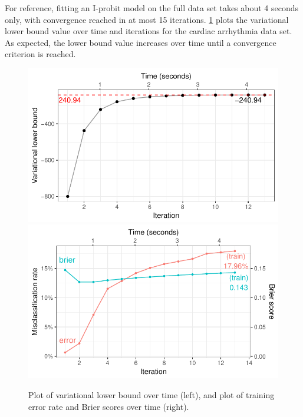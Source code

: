 \documentclass[a4paper,showframe,11pt]{report}\usepackage[]{graphicx}\usepackage[]{color}
\makeatletter
\newenvironment{kframe}{%
 \def\at@end@of@kframe{}%
 \ifinner\ifhmode%
  \def\at@end@of@kframe{\end{minipage}}%
  \begin{minipage}{\columnwidth}%
 \fi\fi%
 \def\FrameCommand##1{\hskip\@totalleftmargin \hskip-\fboxsep
 \colorbox{shadecolor}{##1}\hskip-\fboxsep
     \hskip-\linewidth \hskip-\@totalleftmargin \hskip\columnwidth}%
 \MakeFramed {\advance\hsize-\width
   \@totalleftmargin\z@ \linewidth\hsize
   \@setminipage}}%
 {\par\unskip\endMakeFramed%
 \at@end@of@kframe}
\newenvironment{knitrout}{}{} %
\makeatother
\begin{document}
For reference, fitting an I-probit model on the full data set takes about 4 seconds only, with convergence reached in at most 15 iterations.
\cref{fig:cardiac.mod.full.plot} plots the variational lower bound value over time and iterations for the cardiac arrhythmia data set.
As expected, the lower bound value increases over time until a convergence criterion is reached.




\begin{knitrout}
\color{fgcolor}\begin{kframe}
\singlespacing\end{kframe}\begin{figure}

{\centering \includegraphics[width=0.49\linewidth]{figure/05-cardiac_mod_full_plot-1} 
\includegraphics[width=0.49\linewidth]{figure/05-cardiac_mod_full_plot-2} 

}

\caption[Plot of variational lower bound over time (left), and plot of training error rate and Brier scores over time (right)]{Plot of variational lower bound over time (left), and plot of training error rate and Brier scores over time (right).}\label{fig:cardiac.mod.full.plot}
\end{figure}


\end{knitrout}
\end{document}
